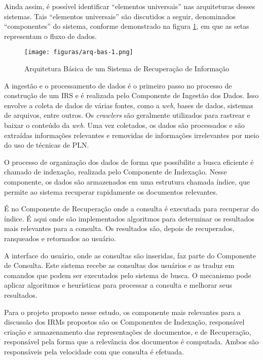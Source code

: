 \documentclass[
	12pt,				%
	openright,			%
	oneside,			%
	a4paper,			%
	english,			%
	french,				%
	spanish,			%
	brazil				%
	]{abntex2}
\begin{document}
Ainda assim, é possível identificar ``elementos
universais'' nas arquiteturas desses sistemas.
Tais ``elementos universais'' são discutidos a seguir, denominados ``componentes'' do sistema, conforme demonstrado na figura \ref{fig:irs-arquitetura},
em que as setas representam o fluxo de dados.

\begin{figure}
    \centering
    \texttt{[image: figuras/arq-bas-1.png]}
    \caption{Arquitetura Básica de um Sistema de Recuperação de Informação}
    \label{fig:irs-arquitetura}
\end{figure}

A ingestão e o processamento de dados é o primeiro passo no processo de construção de um IRS e é realizada pelo Componente de Ingestão dos Dados.
Isso envolve a coleta de dados de várias fontes, como a \textit{web}, bases de dados, sistemas de arquivos, entre outros.
Os \textit{crawlers} são geralmente utilizados para rastrear e baixar o conteúdo da \textit{web}.
Uma vez coletados, os dados são processados e são extraídas informações relevantes e removidas de informações irrelevantes por meio do uso de técnicas de PLN.

O processo de organização dos dados de forma que possibilite a busca eficiente é chamado de indexação,
realizada pelo Componente de Indexação.
Nesse componente, os dados são armazenados em uma estrutura chamada índice, que permite ao sistema recuperar
rapidamente os documentos relevantes.

É no Componente de Recuperação onde a consulta é executada para recuperar do índice.
É aqui onde são implementados algoritmos para determinar os resultados mais relevantes para a consulta.
Os resultados são, depois de recuperados, ranqueados e retornados ao usuário.

A interface do usuário, onde as consultas são inseridas, faz parte do Componente de Consulta.
Este sistema recebe as consultas dos usuários e as traduz em comandos que podem ser executados pelo sistema de busca.
O mecanismo pode aplicar algoritmos e heurísticas para processar a consulta e melhorar seus resultados.

Para o projeto proposto nesse estudo, os componente mais relevantes para a discussão dos IRMs propostos são os Componentes de Indexação, responsável criação e armazenamento das representações de documentos, e de Recuperação, responsável pela forma que a relevância dos documentos é computada. Ambos são responsáveis pela velocidade com que consulta é efetuada.
\end{document}
